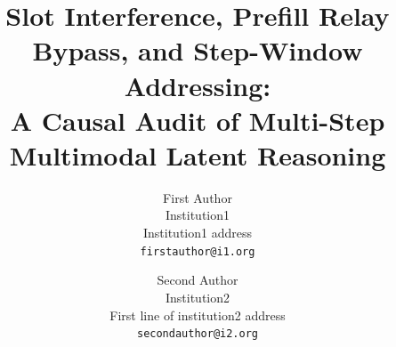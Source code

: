 \documentclass[10pt,twocolumn,letterpaper]{article}
\title{Slot Interference, Prefill Relay Bypass, and Step-Window Addressing:\\A Causal Audit of Multi-Step Multimodal Latent Reasoning}
\author{First Author\\
Institution1\\
Institution1 address\\
{\tt\small firstauthor@i1.org}
\and
Second Author\\
Institution2\\
First line of institution2 address\\
{\tt\small secondauthor@i2.org}
}
\begin{document}
\maketitle








{
    \small
    
    
}


\end{document}
